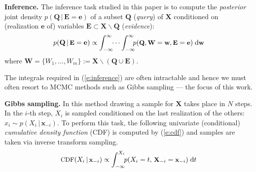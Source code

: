 \documentclass[letterpaper]{article}
\renewcommand{\vec}[1]{\mathbf{#1}}
\newcommand{\bvec}[1]{\textbf{#1}}
\newcommand{\pr}{p}
\newcommand{\dd}{\;\mathrm{d}} %
\begin{document}
\noindent
{\bf Inference.} The inference task studied in this paper is to compute the \emph{posterior} joint density 
$\pr(\bvec{Q} \,|\, \bvec{E}=\bvec{e})$
of 
a subset $\bvec{Q}$ (\emph{query}) of $\bvec{X}$ 
conditioned on (realization $\bvec{e}$ of) 
variables  
$\bvec{E} \subset\bvec{X} \backslash \bvec{Q}$ (\emph{evidence}):
\begin{equation}\vspace{-0.5mm}\footnotesize
\label{e:inference}
\pr(\vec{Q} \,|\, \bvec{E} =\vec{e}) \propto 
\int_{-\infty}^{\infty} \!\! \cdots \int_{-\infty}^{\infty}
\!\!\! \pr(\bvec{Q}, \bvec{W} = \bvec{w}, \bvec{E}=\bvec{e} )
 \dd \bvec{w}
\end{equation}
where $\bvec{W} = \{W_1, \ldots, W_m\} := \vec{X} \backslash (\vec{Q} \cup \vec{E})$. %

The integrals required in 
(\ref{e:inference}) 
are often intractable and hence we must often resort to MCMC methods
such as Gibbs sampling \cite{geman1984stochastic} --- the focus of this work.

\noindent
{\bf Gibbs sampling.}
 In this method drawing a sample for $\bvec{X}$ takes place in $N$ steps.
In the $i$-th step, $X_i$ is sampled conditioned on the last realization of the others:
$x_i \sim \pr(X_i \,|\, \bvec{x}_{-i})$. 
To perform this task, the following univariate (conditional) \emph{cumulative density function} (CDF)
is computed by (\ref{e:cdf}) and samples are taken via inverse transform sampling. 
\begin{equation} \footnotesize
\label{e:cdf}
\text{CDF}(X_i  \,|\, \bvec{x}_{-i}) 
\propto
\int_{-\infty}^{X_i} \!\! \pr(X_i = t, \,\bvec{X}_{-i} = \bvec{x}_{-i})  \dd  t
\end{equation} 
\end{document}
